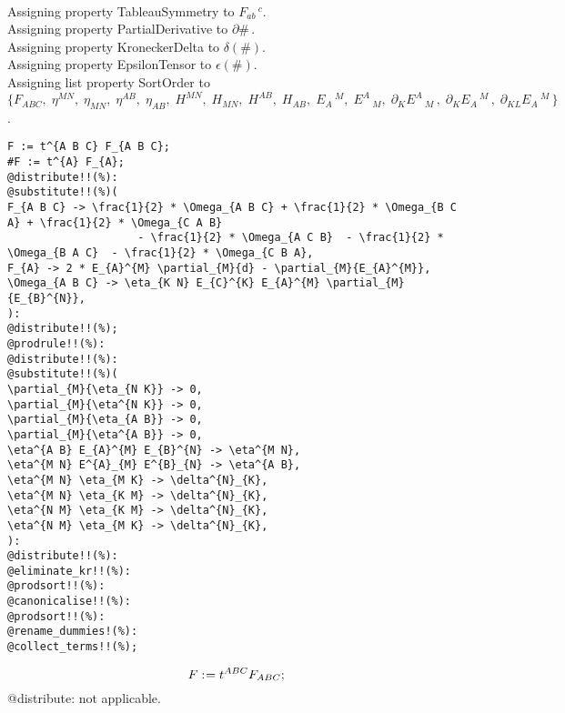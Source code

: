 \documentclass[11pt]{article}
\def\specialcolon{\mathrel{\mathop{:}}\hspace{-.5em}}
\begin{document}
\\
Assigning property TableauSymmetry to ${F}_{a b}\,^{c}$.
\\
Assigning property PartialDerivative to $\partial{\#}\, $.
\\
Assigning property KroneckerDelta to $\delta(\#)$.
\\
Assigning property EpsilonTensor to $\epsilon(\#)$.
\\
Assigning list property SortOrder to $\{{F}_{A B C},\; {\eta}^{M N},\; {\eta}_{M N},\; {\eta}^{A B},\; {\eta}_{A B},\; {H}^{M N},\; {H}_{M N},\; {H}^{A B},\; {H}_{A B},\; {E}_{A}\,^{M},\; {E}^{A}\,_{M},\; {\partial}_{K}{{E}^{A}\,_{M}}\, ,\; {\partial}_{K}{{E}_{A}\,^{M}}\, ,\; {\partial}_{K L}{{E}_{A}\,^{M}}\, \}$.
\\
{\color[named]{Blue}\begin{verbatim}
F := t^{A B C} F_{A B C};
#F := t^{A} F_{A};
@distribute!!(%):
@substitute!!(%)(
F_{A B C} -> \frac{1}{2} * \Omega_{A B C} + \frac{1}{2} * \Omega_{B C A} + \frac{1}{2} * \Omega_{C A B}
                    - \frac{1}{2} * \Omega_{A C B}  - \frac{1}{2} * \Omega_{B A C}  - \frac{1}{2} * \Omega_{C B A},
F_{A} -> 2 * E_{A}^{M} \partial_{M}{d} - \partial_{M}{E_{A}^{M}},
\Omega_{A B C} -> \eta_{K N} E_{C}^{K} E_{A}^{M} \partial_{M}{E_{B}^{N}},
):
@distribute!!(%);
@prodrule!!(%):
@distribute!!(%):
@substitute!!(%)(
\partial_{M}{\eta_{N K}} -> 0,
\partial_{M}{\eta^{N K}} -> 0,
\partial_{M}{\eta_{A B}} -> 0,
\partial_{M}{\eta^{A B}} -> 0,
\eta^{A B} E_{A}^{M} E_{B}^{N} -> \eta^{M N},
\eta^{M N} E^{A}_{M} E^{B}_{N} -> \eta^{A B},
\eta^{M N} \eta_{M K} -> \delta^{N}_{K},
\eta^{M N} \eta_{K M} -> \delta^{N}_{K},
\eta^{N M} \eta_{K M} -> \delta^{N}_{K},
\eta^{N M} \eta_{M K} -> \delta^{N}_{K},
):
@distribute!!(%):
@eliminate_kr!!(%):
@prodsort!!(%):
@canonicalise!!(%):
@prodsort!!(%):
@rename_dummies!(%):
@collect_terms!!(%);
\end{verbatim}}
\begin{dmath*}[compact, spread=2pt]
F\specialcolon{}= {t}^{A B C} {F}_{A B C};
\end{dmath*}
@distribute: not applicable.
\end{document}
